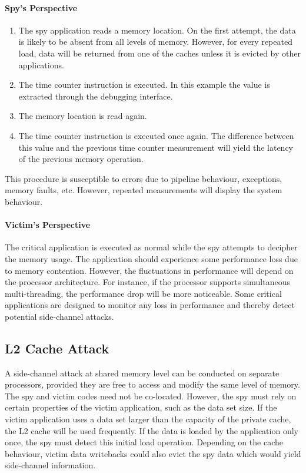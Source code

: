 		\paragraph{Spy's Perspective}
		\begin{enumerate}
			\item The spy application reads a memory location. On the first attempt, the data is likely to be absent from all levels of memory. However, for every repeated load, data will be returned from one of the caches unless it is evicted by other applications.
			\item The time counter instruction is executed. In this example the value is extracted through the debugging interface.
			\item The memory location is read again. 
			\item The time counter instruction is executed once again. The difference between this value and the previous time counter measurement will yield the latency of the previous memory operation.
		\end{enumerate}
	
		This procedure is susceptible to errors due to pipeline behaviour, exceptions, memory faults, etc. However, repeated measurements will display the system behaviour.
		
		\paragraph{Victim's Perspective}
			The critical application is executed as normal while the spy attempts to decipher the memory usage. The application should experience some performance loss due to memory contention. However, the fluctuations in performance will depend on the processor architecture. For instance, if the processor supports simultaneous multi-threading, the performance drop will be more noticeable. Some critical applications are designed to monitor any loss in performance and thereby detect potential side-channel attacks.
		
	\subsection{L2 Cache Attack}
		A side-channel attack at shared memory level can be conducted on separate processors, provided they are free to access and modify the same level of memory. The spy and victim codes need not be co-located. However, the spy must rely on certain properties of the victim application, such as the data set size. If the victim application uses a data set larger than the capacity of the private cache, the L2 cache will be used frequently. If the data is loaded by the application only once, the spy must detect this initial load operation. Depending on the cache behaviour, victim data writebacks could also evict the spy data which would yield side-channel information.
		
